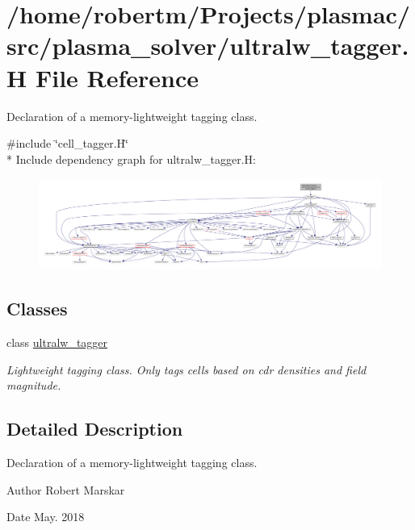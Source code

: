 \hypertarget{ultralw__tagger_8H}{}\section{/home/robertm/\+Projects/plasmac/src/plasma\+\_\+solver/ultralw\+\_\+tagger.H File Reference}
\label{ultralw__tagger_8H}


Declaration of a memory-\/lightweight tagging class.  


{\ttfamily \#include \char`\"{}cell\+\_\+tagger.\+H\char`\"{}}\\*
Include dependency graph for ultralw\+\_\+tagger.\+H\+:\nopagebreak
\begin{figure}[H]
\begin{center}
\leavevmode
\includegraphics[width=350pt]{ultralw__tagger_8H__incl}
\end{center}
\end{figure}
\subsection*{Classes}
\begin{DoxyCompactItemize}
\item 
class \hyperlink{classultralw__tagger}{ultralw\+\_\+tagger}
\begin{DoxyCompactList}\small\item\em Lightweight tagging class. Only tags cells based on cdr densities and field magnitude. \end{DoxyCompactList}\end{DoxyCompactItemize}


\subsection{Detailed Description}
Declaration of a memory-\/lightweight tagging class. 

\begin{DoxyAuthor}{Author}
Robert Marskar 
\end{DoxyAuthor}
\begin{DoxyDate}{Date}
May. 2018 
\end{DoxyDate}
